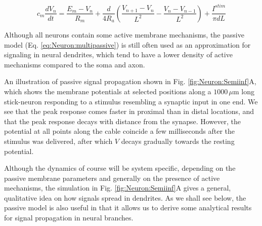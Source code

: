 \begin{equation}
c_m \frac{dV_n}{dt} = \frac{E_m-V_n}{R_m} + \frac{d}{4R_a}\left(\frac{V_{n+1}-V_n}{L^2} - \frac{V_n-V_{n-1}}{L^2} \right) + \frac{I^{stim}}{\pi d L}
\label{eq:Neuron:multipassive}
\end{equation}

Although all neurons contain some active membrane mechanisms, the passive model (Eq. \ref{eq:Neuron:multipassive}) is still often used as an approximation for signaling in neural dendrites, which tend to have a lower density of active mechanisms compared to the soma and axon. 

An illustration of passive signal propagation shown in Fig. \ref{fig:Neuron:Semiinf}A, which shows the membrane potentials at selected positions along a $1000 \, \mu$m long stick-neuron responding to a stimulus resembling a synaptic input in one end. We see that the peak response comes faster in proximal than in distal locations, and that the peak response decays with distance from the synapse. However, the potential at all points along the cable coincide a few milliseconds after the stimulus was delivered, after which $V$  decays gradually towards the resting potential.

Although the dynamics of course will be system specific, depending on the passive membrane parameters and generally on the presence of active mechanisms, the simulation in Fig. \ref{fig:Neuron:Semiinf}A gives a general, qualitative idea on how signals spread in dendrites. As we shall see below, the passive model is also useful in that it allows us to derive some analytical results for signal propagation in neural branches.

